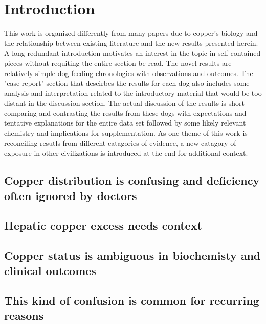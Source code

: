 \newpage
\newcommand{\mjmguide}[1]{ \subsection{#1}}

\section{Introduction  }

This work is organized differently from many papers
due to copper's biology and the relationship between existing
literature and the new results presented herein.
A long redundant introduction  motivates an interest in the topic
in self contained pieces without requiting the entire section  be read.
The novel results are relatively simple dog feeding chronologies
with  observations and outcomes. The "case report" section that
descirbes the results for each dog also includes some analysis
and interpretation related to the   introductory material that would
be too distant in the discussion section. 
The actual discussion of the results is short  comparing 
and contrasting the results
from these dogs with expectations and tentative explanations for
the entire data set  followed by some likely relevant chemistry and 
implications for supplementation. As one theme  of this work is reconciling
resutls from different catagories of evidence, a new catagory 
of exposure in other civilizations is introduced at the end for additional
context.  

\mjmguide{ Copper distribution is confusing and deficiency often ignored by doctors}

\mjmintro


\mjmguide{ Hepatic copper excess needs context  }

\mjmmislead


\mjmguide{ Copper status is ambiguous in biochemisty and clinical outcomes   }

\mjmambig

\mjmguide{ This kind of confusion is common for recurring reasons   }

\mjmconfuse

